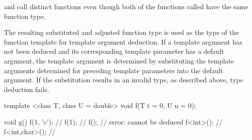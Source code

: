 \pnum
\begin{note}
 and  call distinct functions
even though both of the functions called have the same function type.
\end{note}

\pnum
The resulting substituted and adjusted function type is used as
the type of the function template for template argument
deduction.  If a template argument has not been deduced and its
corresponding template parameter has a default argument, the
template argument is determined by substituting the template
arguments determined for preceding template parameters into the
default argument. If the substitution results in an invalid type,
as described above, type deduction fails.
\begin{example}
\begin{codeblock}
template <class T, class U = double>
void f(T t = 0, U u = 0);

void g() {
  f(1, 'c');        // 
  f(1);             // 
  f();              // error:  cannot be deduced
  f<int>();         // 
  f<int,char>();    // 
}
\end{codeblock}
\end{example}

